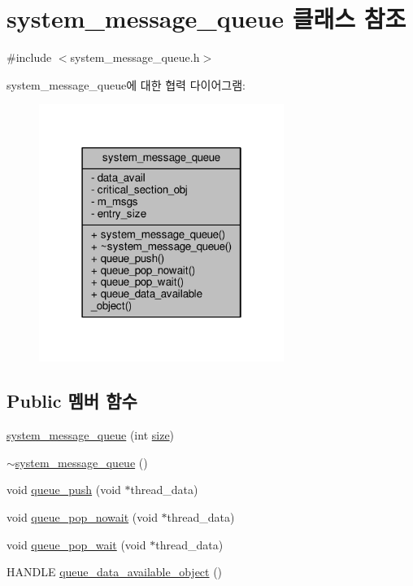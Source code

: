 \hypertarget{classavdecc__lib_1_1system__message__queue}{}\section{system\+\_\+message\+\_\+queue 클래스 참조}
\label{classavdecc__lib_1_1system__message__queue}


{\ttfamily \#include $<$system\+\_\+message\+\_\+queue.\+h$>$}



system\+\_\+message\+\_\+queue에 대한 협력 다이어그램\+:
\nopagebreak
\begin{figure}[H]
\begin{center}
\leavevmode
\includegraphics[width=226pt]{classavdecc__lib_1_1system__message__queue__coll__graph}
\end{center}
\end{figure}
\subsection*{Public 멤버 함수}
\begin{DoxyCompactItemize}
\item 
\hyperlink{classavdecc__lib_1_1system__message__queue_a3376dcc59286a2d7c9dfd321b4eefd05}{system\+\_\+message\+\_\+queue} (int \hyperlink{gst__avb__playbin_8c_a439227feff9d7f55384e8780cfc2eb82}{size})
\item 
\hyperlink{classavdecc__lib_1_1system__message__queue_a736d5cc4de778e454da59bb5342ea2bf}{$\sim$system\+\_\+message\+\_\+queue} ()
\item 
void \hyperlink{classavdecc__lib_1_1system__message__queue_ab4ac378f6d2de95a8714a7d78e38221f}{queue\+\_\+push} (void $\ast$thread\+\_\+data)
\item 
void \hyperlink{classavdecc__lib_1_1system__message__queue_ae21ddf8c4896fce42973b06c5910b721}{queue\+\_\+pop\+\_\+nowait} (void $\ast$thread\+\_\+data)
\item 
void \hyperlink{classavdecc__lib_1_1system__message__queue_abef38d054d5a7d0035a7b46852557d1b}{queue\+\_\+pop\+\_\+wait} (void $\ast$thread\+\_\+data)
\item 
H\+A\+N\+D\+LE \hyperlink{classavdecc__lib_1_1system__message__queue_a8d67bd56dded37f4b89fe039f7d6df4e}{queue\+\_\+data\+\_\+available\+\_\+object} ()
\end{DoxyCompactItemize}
